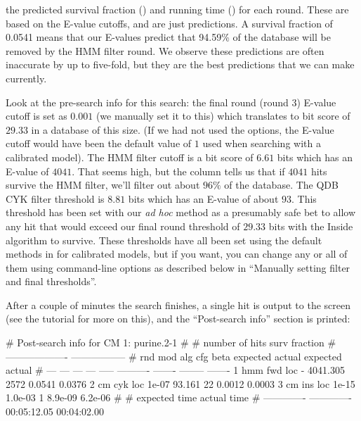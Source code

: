 \begin{wideitem}
\item[\emprog{predictions}] the predicted survival fraction
  () and running time () for each
  round. These are based on the E-value cutoffs, and are just
  predictions. A survival fraction of 0.0541 means that our E-values
  predict that 94.59\% of the database will be removed by the HMM
  filter round. We observe these predictions are often inaccurate by up
  to five-fold, but they are the best predictions
  that we can make currently.
\end{wideitem}

Look at the pre-search info for this search: the final round (round 3)
E-value cutoff is set as $0.001$ (we manually set it to this) which
translates to bit score of $29.33$ in a database of this size. (If we
had not used the  options, the E-value cutoff would have been
the default value of $1$ used when searching with a calibrated
model). The HMM filter cutoff is a bit score of $6.61$ bits which has
an E-value of $4041$.  That seems high, but the  column
tells us that if $4041$ hits survive the HMM filter, we'll filter out
about $96\%$ of the database. The QDB CYK filter threshold is
$8.81$ bits which has an E-value of about $93$. This threshold has
been set with our \emph{ad hoc} method as a presumably safe bet to
allow any hit that would exceed our final round threshold of $29.33$
bits with the Inside algorithm to survive. These thresholds have all
been set using the default methods in  for calibrated
models, but if you want, you can change any or all of them using
command-line options as described below in ``Manually setting filter
and final thresholds''.

After a couple of minutes the search finishes, a single hit is output
to the screen (see the tutorial for more on this), and the
``Post-search info'' section is printed:

\begin{sreoutput}
# Post-search info for CM 1: purine.2-1
#
#                              number of hits       surv fraction  
#                            -------------------  -----------------
# rnd  mod  alg  cfg   beta    expected   actual  expected   actual
# ---  ---  ---  ---  -----  ----------  -------  --------  -------
    1  hmm  fwd  loc      -    4041.305     2572    0.0541   0.0376
    2   cm  cyk  loc  1e-07      93.161       22    0.0012   0.0003
    3   cm  ins  loc  1e-15     1.0e-03        1   8.9e-09  6.2e-06
#
# expected time    actual time
# -------------  -------------
    00:05:12.05    00:04:02.00
\end{sreoutput}

